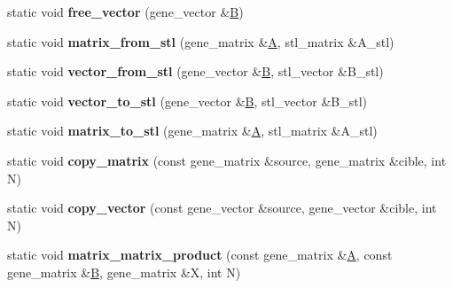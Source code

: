 \begin{DoxyCompactItemize}
static void {\bfseries free\+\_\+vector} (gene\+\_\+vector \&\hyperlink{group___core___module_class_eigen_1_1_matrix}{B})
\item 
\mbox{\label{classtvmet__interface_a79d2375c8e409df4a254db56411981c2}} 
static void {\bfseries matrix\+\_\+from\+\_\+stl} (gene\+\_\+matrix \&\hyperlink{group___core___module_class_eigen_1_1_matrix}{A}, stl\+\_\+matrix \&A\+\_\+stl)
\item 
\mbox{\label{classtvmet__interface_a3104d435838c1e1930b5cdd02a55e0d2}} 
static void {\bfseries vector\+\_\+from\+\_\+stl} (gene\+\_\+vector \&\hyperlink{group___core___module_class_eigen_1_1_matrix}{B}, stl\+\_\+vector \&B\+\_\+stl)
\item 
\mbox{\label{classtvmet__interface_a11f315dd0938c0890fd8dc78b501bf10}} 
static void {\bfseries vector\+\_\+to\+\_\+stl} (gene\+\_\+vector \&\hyperlink{group___core___module_class_eigen_1_1_matrix}{B}, stl\+\_\+vector \&B\+\_\+stl)
\item 
\mbox{\label{classtvmet__interface_a8489bba6ec150a288675b12d7777c0a5}} 
static void {\bfseries matrix\+\_\+to\+\_\+stl} (gene\+\_\+matrix \&\hyperlink{group___core___module_class_eigen_1_1_matrix}{A}, stl\+\_\+matrix \&A\+\_\+stl)
\item 
\mbox{\label{classtvmet__interface_ad01354f6057c198b0082e3de4271d3a9}} 
static void {\bfseries copy\+\_\+matrix} (const gene\+\_\+matrix \&source, gene\+\_\+matrix \&cible, int N)
\item 
\mbox{\label{classtvmet__interface_a897b4b39e7080d4afed99c3153db8f4f}} 
static void {\bfseries copy\+\_\+vector} (const gene\+\_\+vector \&source, gene\+\_\+vector \&cible, int N)
\item 
\mbox{\label{classtvmet__interface_a35413605a24d19868bded3dc0a64da16}} 
static void {\bfseries matrix\+\_\+matrix\+\_\+product} (const gene\+\_\+matrix \&\hyperlink{group___core___module_class_eigen_1_1_matrix}{A}, const gene\+\_\+matrix \&\hyperlink{group___core___module_class_eigen_1_1_matrix}{B}, gene\+\_\+matrix \&X, int N)
\item 
\mbox{\label{classtvmet__interface_ad83c1e64a297e784e66e9d8ff76f4ac7}} 

\end{DoxyCompactItemize}
